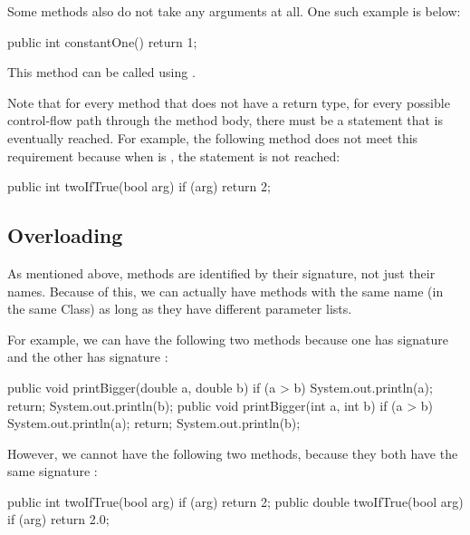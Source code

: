 Some methods also do not take any arguments at all. One such example is below:
\begin{code}
public int constantOne() {
  return 1;
}
\end{code}
\noindent This method can be called using .

Note that for every method that does not have a  return type,
for every possible control-flow path through the method body,
there must be a  statement that is eventually reached.
For example, the following method does not meet this requirement
because when  is , the  statement is not
reached:
\begin{code}
public int twoIfTrue(bool arg) {
  if (arg) {
    return 2;
  }
}
\end{code}

\subsection{Overloading}
As mentioned above, methods are identified by their signature, not just their names.
Because of this, we can actually have methods with the same name (in the same
Class) as long as they have different parameter lists.

For example, we can have the following two methods because
one has signature  and the other
has signature :
\begin{code}
public void printBigger(double a, double b) {
  if (a > b) {
    System.out.println(a);
    return;
  }
  System.out.println(b);
}
public void printBigger(int a, int b) {
  if (a > b) {
    System.out.println(a);
    return;
  }
  System.out.println(b);
}
\end{code}

However, we cannot have the following two methods, because they both have the
same signature :
\begin{code}
public int twoIfTrue(bool arg) {
  if (arg) {
    return 2;
  }
}
public double twoIfTrue(bool arg) {
  if (arg) {
    return 2.0;
  }
}
\end{code}

